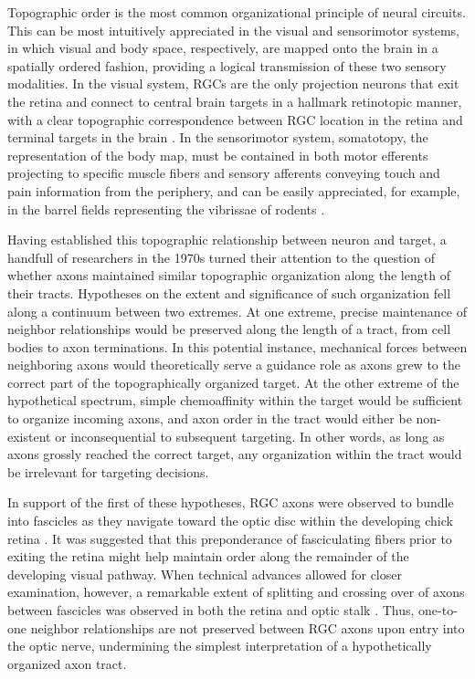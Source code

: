 Topographic order is the most common organizational principle of neural circuits.
This can be most intuitively appreciated in the visual and sensorimotor systems, in which visual and body space, respectively, are mapped onto the brain in a spatially ordered fashion, providing a logical transmission of these two sensory modalities.
In the visual system, RGCs are the only projection neurons that exit the retina and connect to central brain targets in a hallmark retinotopic manner, with a clear topographic correspondence between RGC location in the retina and terminal targets in the brain \cite{lund1974organization}.
In the sensorimotor system, somatotopy, the representation of the body map, must be contained in both motor efferents projecting to specific muscle fibers and sensory afferents conveying touch and pain information from the periphery, and can be easily appreciated, for example, in the barrel fields representing the vibrissae of rodents \cite{woolsey1970structural}.

Having established this topographic relationship between neuron and target, a handfull of researchers in the 1970s turned their attention to the question of whether axons maintained similar topographic organization along the length of their tracts.
Hypotheses on the extent and significance of such organization fell along a continuum between two extremes.
At one extreme, precise maintenance of neighbor relationships would be preserved along the length of a tract, from cell bodies to axon terminations.
In this potential instance, mechanical forces between neighboring axons would theoretically serve a guidance role as axons grew to the correct part of the topographically organized target.
At the other extreme of the hypothetical spectrum, simple chemoaffinity within the target would be sufficient to organize incoming axons, and axon order in the tract would either be non-existent or inconsequential to subsequent targeting.
In other words, as long as axons grossly reached the correct target, any organization within the tract would be irrelevant for targeting decisions.

In support of the first of these hypotheses, RGC axons were observed to bundle into fascicles as they navigate toward the optic disc within the developing chick retina \cite{goldberg1972topographical}.
It was suggested that this preponderance of fasciculating fibers prior to exiting the retina might help maintain order along the remainder of the developing visual pathway. 
When technical advances allowed for closer examination, however, a remarkable extent of splitting and crossing over of axons between fascicles was observed in both the retina \cite{simon1991relationship} and optic stalk \cite{simon1991relationship,williams1985dispersion}.
Thus, one-to-one neighbor relationships are not preserved between RGC axons upon entry into the optic nerve, undermining the simplest interpretation of a hypothetically organized axon tract.

